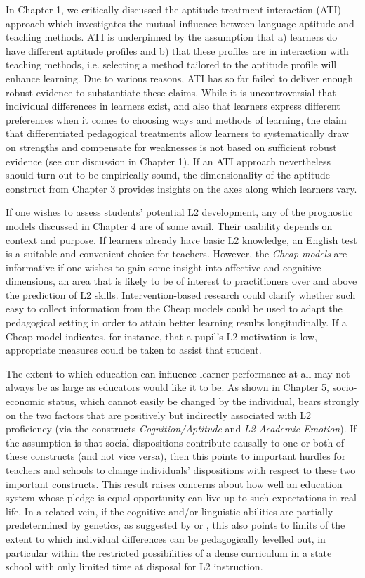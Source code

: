 \documentclass[output=paper]{langsci/langscibook}
\begin{document}
In Chapter 1, we critically discussed the aptitude-treatment-interaction (ATI) approach which investigates the mutual influence between language aptitude and teaching methods. ATI is underpinned by the assumption that a) learners do have different aptitude profiles and b) that these profiles are in interaction with teaching methods, i.e. selecting a method tailored to the aptitude profile will enhance learning. Due to various reasons, ATI has so far failed to deliver enough robust evidence to substantiate these claims. While it is uncontroversial that individual differences in learners exist, and also that learners express different preferences when it comes to choosing ways and methods of learning, the claim that differentiated pedagogical treatments allow learners to systematically draw on strengths and compensate for weaknesses is not based on sufficient robust evidence (see our discussion in Chapter 1). If an ATI approach nevertheless should turn out to be empirically sound, the dimensionality of the aptitude construct from Chapter 3 provides insights on the axes along which learners vary.

If one wishes to assess students’ potential L2 development, any of the prognostic models discussed in Chapter 4 are of some avail. Their usability depends on context and purpose. If learners already have basic L2 knowledge, an English test is a suitable and convenient choice for teachers. However, the \textit{Cheap models} are informative if one wishes to gain some insight into affective and cognitive dimensions, an area that is likely to be of interest to practitioners over and above the prediction of L2 skills. Intervention-based research could clarify whether such easy to collect information from the Cheap models could be used to adapt the pedagogical setting in order to attain better learning results longitudinally. If a Cheap model indicates, for instance, that a pupil’s L2 motivation is low, appropriate measures could be taken to assist that student. 

The extent to which education can influence learner performance at all may not always be as large as educators would like it to be. As shown in Chapter 5, socio-economic status, which cannot easily be changed by the individual, bears strongly on the two factors that are positively but indirectly associated with L2 proficiency (via the constructs \textit{Cognition/Aptitude} and \textit{L2 Academic Emotion}). If the assumption is that social dispositions contribute causally to one or both of these constructs (and not vice versa), then this points to important hurdles for teachers and schools to change individuals’ dispositions with respect to these two important constructs. This result raises concerns about how well an education system whose pledge is equal opportunity can live up to such expectations in real life. In a related vein, if the cognitive and/or linguistic abilities are partially predetermined by genetics, as suggested by \citet{Plomin2019} or \citet{Stromswold2001}, this also points to limits of the extent to which individual differences can be pedagogically levelled out, in particular within the restricted possibilities of a dense curriculum in a state school with only limited time at disposal for L2 instruction.
\end{document}
